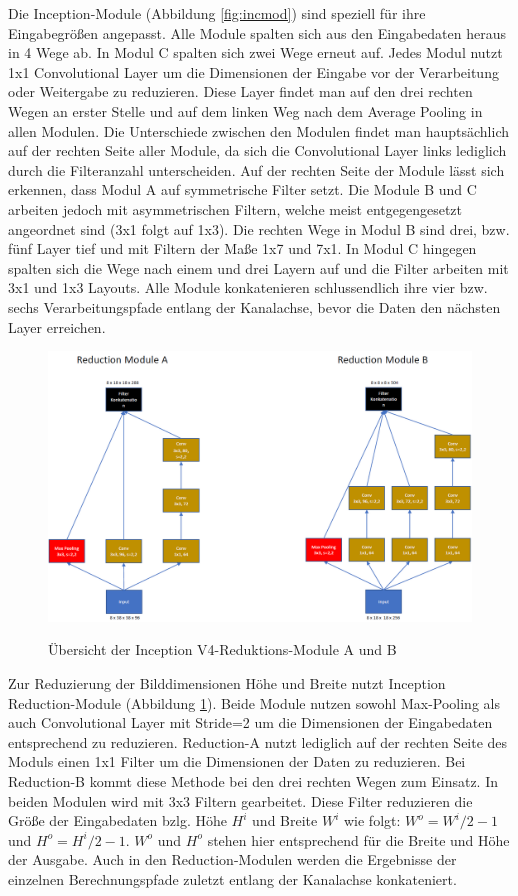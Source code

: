Die Inception-Module (Abbildung \ref{fig:incmod}) sind speziell für ihre Eingabegrößen angepasst. Alle Module spalten sich aus den Eingabedaten heraus in 4 Wege ab. In Modul C spalten sich zwei Wege erneut auf. Jedes Modul nutzt 1x1 Convolutional Layer um die Dimensionen der Eingabe vor der Verarbeitung oder Weitergabe zu reduzieren. Diese Layer findet man auf den drei rechten Wegen an erster Stelle und auf dem linken Weg nach dem Average Pooling in allen Modulen. Die Unterschiede zwischen den Modulen findet man hauptsächlich auf der rechten Seite aller Module, da sich die Convolutional Layer links lediglich durch die Filteranzahl unterscheiden. Auf der rechten Seite der Module lässt sich erkennen, dass Modul A auf symmetrische Filter setzt. Die Module B und C arbeiten jedoch mit asymmetrischen Filtern, welche meist entgegengesetzt angeordnet sind (3x1 folgt auf 1x3). Die rechten Wege in Modul B sind drei, bzw. fünf Layer tief und mit Filtern der Maße 1x7 und 7x1. In Modul C hingegen spalten sich die Wege nach einem und drei Layern auf und die Filter arbeiten mit 3x1 und 1x3 Layouts. Alle Module konkatenieren schlussendlich ihre vier bzw. sechs Verarbeitungspfade entlang der Kanalachse, bevor die Daten den nächsten Layer erreichen.

\begin{figure}[H]
\centering
\caption[Caption for LOF]{Übersicht der Inception V4-Reduktions-Module A und B}
\includegraphics[scale=0.3]{pictures/Inception/Reduction}
\label{fig:incred}
\end{figure}

Zur Reduzierung der Bilddimensionen Höhe und Breite nutzt Inception Reduction-Module (Abbildung \ref{fig:incred}). Beide Module nutzen sowohl Max-Pooling als auch Convolutional Layer mit Stride=2 um die Dimensionen der Eingabedaten entsprechend zu reduzieren. Reduction-A nutzt lediglich auf der rechten Seite des Moduls einen 1x1 Filter um die Dimensionen der Daten zu reduzieren. Bei Reduction-B kommt diese Methode bei den drei rechten Wegen zum Einsatz. In beiden Modulen wird mit 3x3 Filtern gearbeitet. Diese Filter reduzieren die Größe der Eingabedaten bzlg. Höhe $H^i$ und Breite $W^i$ wie folgt: $W^o = W^i / 2 - 1$ und $H^o = H^i / 2 - 1$. $W^o$ und $H^o$ stehen hier entsprechend für die Breite und Höhe der Ausgabe. Auch in den Reduction-Modulen werden die Ergebnisse der einzelnen Berechnungspfade zuletzt entlang der Kanalachse konkateniert. 

